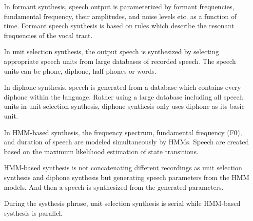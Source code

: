 \documentclass[12pt]{article}
\newenvironment{problem}[2][Problem]{\begin{trivlist}
\item[\hskip \labelsep {\bfseries #1}\hskip \labelsep {\bfseries #2.}]}{\end{trivlist}}
\begin{document}
\begin{problem}{2.1}
    In formant synthesis, speech output is parameterized by formant frequencies,
    fundamental frequency, their amplitudes, and noise levels etc. as a function 
    of time. Formant speech synthesis is based on rules which describe
    the resonant frequencies of the vocal tract.

    In unit selection synthesis, the output speech is synthesized by selecting 
    appropriate speech units from large databases of recorded speech. 
    The speech units can be phone, diphone, half-phones or words.

    In diphone synthesis, speech is generated from a database which contains 
    every diphone within the language. 
    Rather using a large database including all speech units in unit selection
    synthesis, diphone synthesis only uses diphone as its basic unit.

    In HMM-based synthesis, the frequency spectrum, 
    fundamental frequency (F0), and duration of speech 
    are modeled simultaneously by HMMs. 
    Speech are created based on the maximum likelihood estimation of state transitions.

    HMM-based synthesis is not concatenating different recordings 
    as unit selection synthesis and diphone synthesis but generating speech parameters
    from the HMM models. And then a speech is synthesized from the generated parameters.

    During the systhesis phrase, unit selection synthesis is serial while HMM-based
    systhesis is parallel.
\end{problem}
\end{document}
